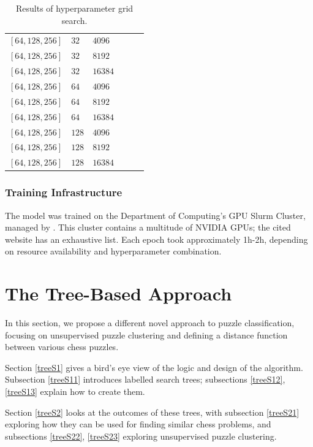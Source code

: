 \begin{table}[H]
\begin{adjustbox}{width=\textwidth}
\begin{tabular}{lll|rrr}
      

      $[64, 128, 256 ]$& $32$ & $4096$ & && \\
      $[64, 128, 256 ]$& $32$ & $8192$ & && \\
      $[64, 128, 256 ]$& $32$ & $16384$ & && \\[0.1cm]
      
      $[64, 128, 256 ]$& $64$ & $4096$ & && \\
      $[64, 128, 256 ]$& $64$ & $8192$ & && \\
      $[64, 128, 256 ]$& $64$ & $16384$ & && \\[0.1cm]
      
      $[64, 128, 256 ]$& $128$  & $4096$ & && \\
      $[64, 128, 256 ]$& $128$ & $8192$ & && \\
      $[64, 128, 256 ]$& $128$ & $16384$ & && \\

    \end{tabular}
  \end{adjustbox}
  \caption{Results of hyperparameter grid search.}
  \label{tabHyperparam}
\end{table}

\subsection{Training Infrastructure}\label{mlS23}

The model was trained on the Department of Computing's GPU Slurm Cluster,
managed by \citet{csgGPU}. This cluster contains a multitude of NVIDIA GPUs;
the cited website has an exhaustive list. Each epoch took approximately 1h-2h,
depending on resource availability and hyperparameter combination.

\chapter{The Tree-Based Approach}\label{treeChapter}

In this section, we propose a different novel approach to puzzle
classification, focusing on unsupervised puzzle clustering and defining a
distance function between various chess puzzles.

Section \ref{treeS1} gives a bird's eye view of the logic and design of the
algorithm. Subsection \ref{treeS11} introduces labelled search trees;
subsections \ref{treeS12}, \ref{treeS13} explain how to create them.

Section \ref{treeS2} looks at the outcomes of these trees, with subsection
\ref{treeS21} exploring how they can be used for finding similar chess
problems, and subsections \ref{treeS22}, \ref{treeS23} exploring unsupervised
puzzle clustering.

